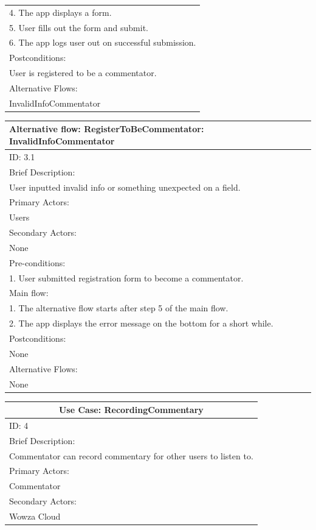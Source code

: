 \documentclass{article}
\begin{document}
\begin{flushleft}
\begin{longtable}[l]{|l|}
4. The app displays a form.\\
5. User fills out the form and submit.\\
6. The app logs user out on successful submission.\\
\hline
Postconditions:\\
User is registered to be a commentator.\\
\hline
Alternative Flows:\\
InvalidInfoCommentator\\
\hline
\end{longtable}
\begin{longtable}[l]{|l|}
\hline
Alternative flow: RegisterToBeCommentator: InvalidInfoCommentator\\
\hline
ID: 3.1\\
\hline
Brief Description: \\
User inputted invalid info or something unexpected on a field.\\
\hline
Primary Actors:\\
Users\\
\hline
Secondary Actors:\\
None\\
\hline
Pre-conditions:\\
1. User submitted registration form to become a commentator.\\
\hline
Main flow:\\
1. The alternative flow starts after step 5 of the main flow.\\
2. The app displays the error message on the bottom for a short while.\\
\hline
Postconditions:\\
None\\
\hline
Alternative Flows:\\
None\\
\hline
\end{longtable}
\begin{longtable}[l]{|l|}
\hline
\multicolumn{1}{|c|}{Use Case: RecordingCommentary}\\
\hline
ID: 4\\
\hline
Brief Description: \\
Commentator can record commentary for other users to listen to.\\
\hline
Primary Actors:\\
Commentator\\
\hline
Secondary Actors:\\
Wowza Cloud\\
\hline

\end{longtable}
\end{flushleft}
\end{document}

